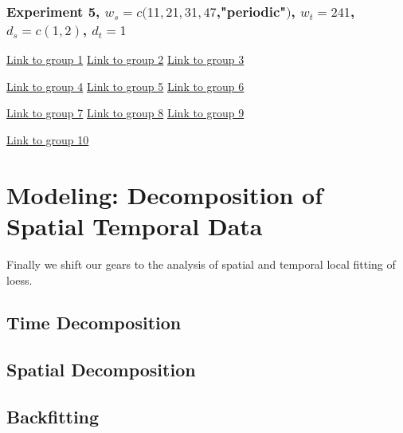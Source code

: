 \subsubsection{Experiment 5,  
\textmd{$w_s=c(11, 21, 31, 47$,"periodic"$)$, $w_t=241$, $d_s=c(1,2)$, $d_t=1$}
}

\begin{framed}
\begin{center}
  \href{../plots/a1950/E5/QQ.error.tmax.group.1.pdf}{Link to group 1} 
  \;\;\;\;\;\;\;\;\;\;
  \href{../plots/a1950/E5/QQ.error.tmax.group.2.pdf}{Link to group 2} 
  \;\;\;\;\;\;\;\;\;\;
  \href{../plots/a1950/E5/QQ.error.tmax.group.3.pdf}{Link to group 3}
\end{center}
\begin{center}
  \href{../plots/a1950/E5/QQ.error.tmax.group.4.pdf}{Link to group 4} 
  \;\;\;\;\;\;\;\;\;\;
  \href{../plots/a1950/E5/QQ.error.tmax.group.5.pdf}{Link to group 5} 
  \;\;\;\;\;\;\;\;\;\;
  \href{../plots/a1950/E5/QQ.error.tmax.group.6.pdf}{Link to group 6}
\end{center}
\begin{center}
  \href{../plots/a1950/E5/QQ.error.tmax.group.7.pdf}{Link to group 7} 
  \;\;\;\;\;\;\;\;\;\;
  \href{../plots/a1950/E5/QQ.error.tmax.group.8.pdf}{Link to group 8} 
  \;\;\;\;\;\;\;\;\;\;
  \href{../plots/a1950/E5/QQ.error.tmax.group.9.pdf}{Link to group 9}
\end{center}
\begin{center}
  \href{../plots/a1950/E5/QQ.error.tmax.group.10.pdf}{Link to group 10}  
  \label{QQ.error.laggroup}
\end{center}
\end{framed}

\section{Modeling: Decomposition of Spatial Temporal Data}

Finally we shift our gears to the analysis of spatial and temporal local fitting 
of loess. 

\subsection{Time Decomposition}

\subsection{Spatial Decomposition}

\subsection{Backfitting}